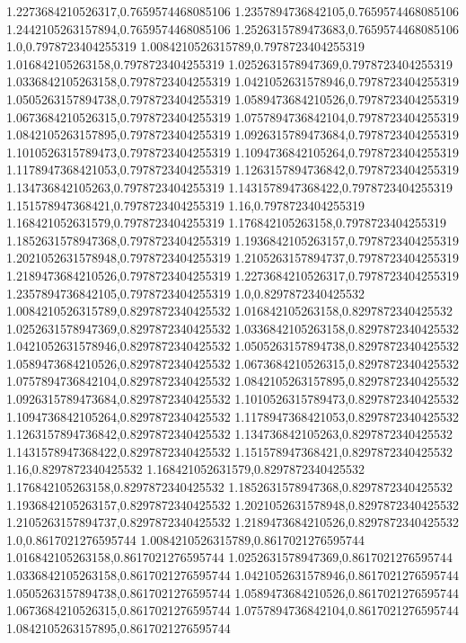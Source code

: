 1.2273684210526317,0.7659574468085106
1.2357894736842105,0.7659574468085106
1.2442105263157894,0.7659574468085106
1.2526315789473683,0.7659574468085106
1.0,0.7978723404255319
1.0084210526315789,0.7978723404255319
1.016842105263158,0.7978723404255319
1.0252631578947369,0.7978723404255319
1.0336842105263158,0.7978723404255319
1.0421052631578946,0.7978723404255319
1.0505263157894738,0.7978723404255319
1.0589473684210526,0.7978723404255319
1.0673684210526315,0.7978723404255319
1.0757894736842104,0.7978723404255319
1.0842105263157895,0.7978723404255319
1.0926315789473684,0.7978723404255319
1.1010526315789473,0.7978723404255319
1.1094736842105264,0.7978723404255319
1.1178947368421053,0.7978723404255319
1.1263157894736842,0.7978723404255319
1.134736842105263,0.7978723404255319
1.1431578947368422,0.7978723404255319
1.151578947368421,0.7978723404255319
1.16,0.7978723404255319
1.168421052631579,0.7978723404255319
1.176842105263158,0.7978723404255319
1.1852631578947368,0.7978723404255319
1.1936842105263157,0.7978723404255319
1.2021052631578948,0.7978723404255319
1.2105263157894737,0.7978723404255319
1.2189473684210526,0.7978723404255319
1.2273684210526317,0.7978723404255319
1.2357894736842105,0.7978723404255319
1.0,0.8297872340425532
1.0084210526315789,0.8297872340425532
1.016842105263158,0.8297872340425532
1.0252631578947369,0.8297872340425532
1.0336842105263158,0.8297872340425532
1.0421052631578946,0.8297872340425532
1.0505263157894738,0.8297872340425532
1.0589473684210526,0.8297872340425532
1.0673684210526315,0.8297872340425532
1.0757894736842104,0.8297872340425532
1.0842105263157895,0.8297872340425532
1.0926315789473684,0.8297872340425532
1.1010526315789473,0.8297872340425532
1.1094736842105264,0.8297872340425532
1.1178947368421053,0.8297872340425532
1.1263157894736842,0.8297872340425532
1.134736842105263,0.8297872340425532
1.1431578947368422,0.8297872340425532
1.151578947368421,0.8297872340425532
1.16,0.8297872340425532
1.168421052631579,0.8297872340425532
1.176842105263158,0.8297872340425532
1.1852631578947368,0.8297872340425532
1.1936842105263157,0.8297872340425532
1.2021052631578948,0.8297872340425532
1.2105263157894737,0.8297872340425532
1.2189473684210526,0.8297872340425532
1.0,0.8617021276595744
1.0084210526315789,0.8617021276595744
1.016842105263158,0.8617021276595744
1.0252631578947369,0.8617021276595744
1.0336842105263158,0.8617021276595744
1.0421052631578946,0.8617021276595744
1.0505263157894738,0.8617021276595744
1.0589473684210526,0.8617021276595744
1.0673684210526315,0.8617021276595744
1.0757894736842104,0.8617021276595744
1.0842105263157895,0.8617021276595744
